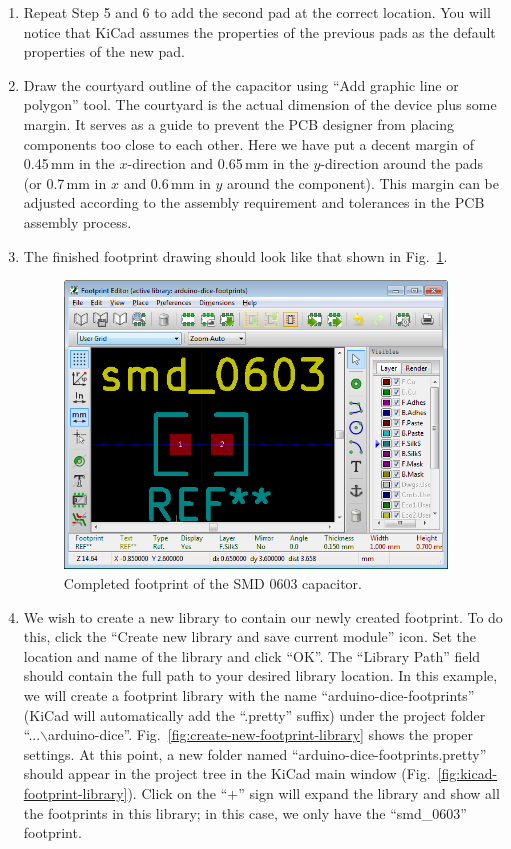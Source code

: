 \documentclass[12pt,letterpaper]{scrartcl}
\begin{document}
\begin{enumerate}
	\item Repeat Step 5 and 6 to add the second pad at the correct location. You will notice that KiCad assumes the properties of the previous pads as the default properties of the new pad. 
	
	\item Draw the courtyard outline of the capacitor using ``Add graphic line or polygon'' tool. The courtyard is the actual dimension of the device plus some margin. It serves as a guide to prevent the PCB designer from placing components too close to each other. Here we have put a decent margin of 0.45\,mm in the $x $-direction and 0.65\,mm in the $y$-direction around the pads (or 0.7\,mm in $x$ and 0.6\,mm in $y$ around the component). This margin can be adjusted according to the assembly requirement and tolerances in the PCB assembly process.  
	  
	\item The finished footprint drawing should look like that shown in Fig.~\ref{fig:smd_cap_footprint_final}.
		
		\begin{figure}[hp]
			\centering
			\includegraphics[width=4in]{smd_cap_footprint_final}
			\caption{Completed footprint of the SMD 0603 capacitor.}
			\label{fig:smd_cap_footprint_final}
		\end{figure}
			
	\item We wish to create a new library to contain our newly created footprint. To do this, click the ``Create new library and save current module'' icon. Set the location and name of the library and click ``OK''. The ``Library Path'' field should contain the full path to your desired library location. In this example, we will create a footprint library with the name ``arduino-dice-footprints'' (KiCad will automatically add the ``.pretty'' suffix) under the project folder ``...$\backslash$arduino-dice''. Fig.~\ref{fig:create-new-footprint-library} shows the proper settings. At this point, a new folder named ``arduino-dice-footprints.pretty'' should appear in the project tree in the KiCad main window (Fig.~\ref{fig:kicad-footprint-library}). Click on the ``$+$'' sign will expand the library and show all the footprints in this library; in this case, we only have the ``smd\_0603'' footprint.
	

\end{enumerate}
\end{document}
